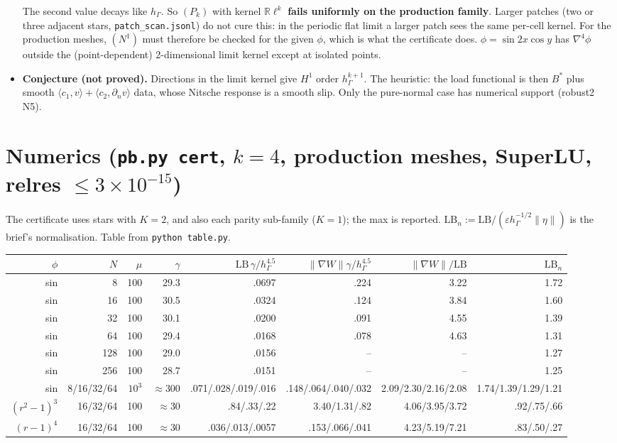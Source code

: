 \documentclass[11pt]{article}
\theoremstyle{remark}
\newcommand{\hG}{h_\Gamma}
\newcommand{\ip}[2]{\langle #1,#2\rangle}
\begin{document}
\begin{itemize}
\noindent The second value decays like $\hG$. So $(P_k)$ with kernel $\mathbb R\ell^k$ \textbf{fails uniformly on the production
family}. Larger patches (two or three adjacent stars, \texttt{patch\_scan.jsonl}) do not cure this: in the periodic flat limit a
larger patch sees the same per-cell kernel. For the production meshes, $(N^1)$ must therefore be checked for the given $\phi$,
which is what the certificate does. $\phi=\sin2x\cos y$ has $\nabla^4\phi$ outside the (point-dependent) 2-dimensional limit
kernel except at isolated points.
\item \textbf{Conjecture (not proved).} Directions in the limit kernel give $H^1$ order $\hG^{k+1}$. The heuristic: the load
functional is then $B^\ast$ plus smooth $\ip{c_1}{v}+\ip{c_2}{\partial_nv}$ data, whose Nitsche response is a smooth slip.
Only the pure-normal case has numerical support (robust2 N5).
\end{itemize}

\section{Numerics (\texttt{pb.py cert}, $k=4$, production meshes, SuperLU, relres $\le3\times10^{-15}$)}
The certificate uses stars with $K=2$, and also each parity sub-family ($K=1$); the max is reported.
$\mathrm{LB}_n:=\mathrm{LB}/(\varepsilon\hG^{-1/2}\|\eta\|)$ is the brief's normalisation. Table from \texttt{python table.py}.

\begin{center}\small
\begin{tabular}{rrrrrrrr}\toprule
$\phi$ & $N$ & $\mu$ & $\gamma$ & $\mathrm{LB}\,\gamma/\hG^{4.5}$ & $\|\nabla W\|\gamma/\hG^{4.5}$ & $\|\nabla W\|/\mathrm{LB}$ & $\mathrm{LB}_n$\\\midrule
sin & 8 & 100 & 29.3 & .0697 & .224 & 3.22 & 1.72\\
sin & 16 & 100 & 30.5 & .0324 & .124 & 3.84 & 1.60\\
sin & 32 & 100 & 30.1 & .0200 & .091 & 4.55 & 1.39\\
sin & 64 & 100 & 29.4 & .0168 & .078 & 4.63 & 1.31\\
sin & 128 & 100 & 29.0 & .0156 & -- & -- & 1.27\\
sin & 256 & 100 & 28.7 & .0151 & -- & -- & 1.25\\
sin & 8/16/32/64 & $10^3$ & $\approx$300 & .071/.028/.019/.016 & .148/.064/.040/.032 & 2.09/2.30/2.16/2.08 & 1.74/1.39/1.29/1.21\\
$(r^2-1)^3$ & 16/32/64 & 100 & $\approx$30 & .84/.33/.22 & 3.40/1.31/.82 & 4.06/3.95/3.72 & .92/.75/.66\\
$(r-1)^4$ & 16/32/64 & 100 & $\approx$30 & .036/.013/.0057 & .153/.066/.041 & 4.23/5.19/7.21 & .83/.50/.27\\\bottomrule
\end{tabular}
\end{center}
\end{document}
